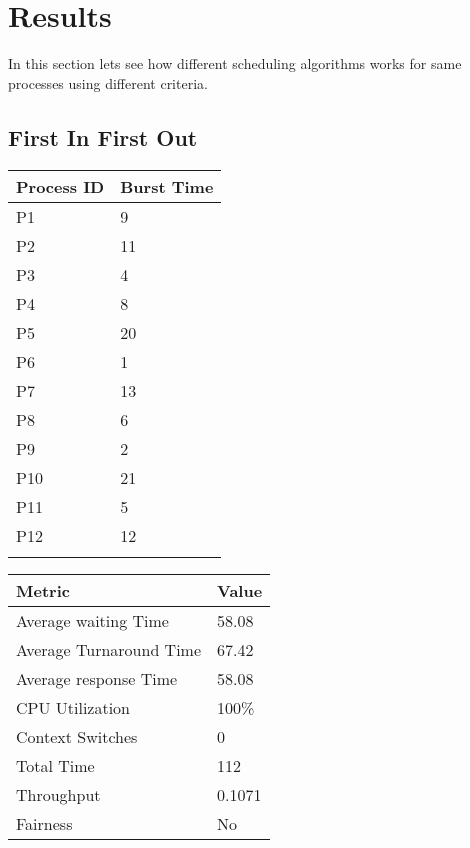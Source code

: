 \documentclass{article}
\begin{document}
\section{Results}
In this section lets see how different scheduling algorithms works for same processes using different criteria.
\vspace{\baselineskip}
\subsection{First In First Out}

\vspace{\baselineskip}
\hspace{1cm}

\begin{minipage}[t]{0.3\textwidth}
    \begin{tabularx}{\textwidth}{|l|X|}
    \hline
    \rowcolor{darkblue}
    \textbf{Process ID} & \textbf{Burst Time}\\
    \hline
    \rowcolor{lightblue}
    P1 & 9 \\
    P2 & 11 \\
    \rowcolor{lightblue}
    P3 & 4 \\
    P4 & 8 \\
    \rowcolor{lightblue}
    P5 & 20 \\
    P6 & 1 \\
    \rowcolor{lightblue}
    P7 & 13 \\
    P8 & 6 \\
    \rowcolor{lightblue}
    P9 & 2 \\
    P10 & 21 \\
    \rowcolor{lightblue}
    P11 & 5 \\
    P12 & 12 \\
    \rowcolor{lightblue}
    \hline
    \end{tabularx}
\end{minipage}
\hspace{2cm}
\begin{minipage}[t!]{0.35\textwidth}
    \begin{tabularx}{\textwidth}{|l|X|}
    \hline
    \rowcolor{darkblue}
    \textbf{Metric} & \textbf{Value} \\
    \hline
    \rowcolor{lightblue}
    Average waiting Time & 58.08 \\
    Average Turnaround Time & 67.42 \\
    \rowcolor{lightblue}
    Average response Time & 58.08 \\
    CPU Utilization & 100\% \\
    \rowcolor{lightblue}
    Context Switches & 0 \\
    Total Time & 112 \\
    \rowcolor{lightblue}
    Throughput & 0.1071 \\
    Fairness & No \\
    \hline
    \end{tabularx}
\end{minipage}
\end{document}
